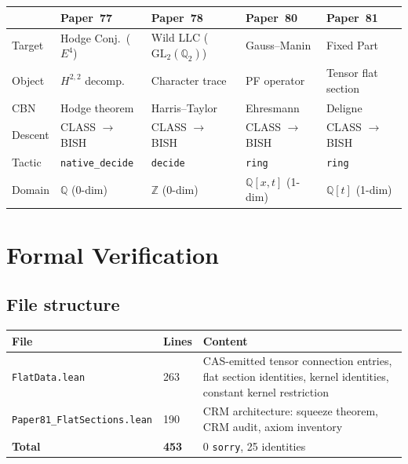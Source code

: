 \documentclass[11pt]{article}
\theoremstyle{plain}
\theoremstyle{definition}
\theoremstyle{remark}
\newcommand{\Z}{\mathbb{Z}}
\newcommand{\Q}{\mathbb{Q}}
\newcommand{\GL}{\mathrm{GL}}
\begin{document}
\begin{center}
\begin{tabular}{lllll}
\toprule
& \textbf{Paper~77} & \textbf{Paper~78} & \textbf{Paper~80} & \textbf{Paper~81} \\
\midrule
Target    & Hodge Conj.\ ($E^4$) & Wild LLC ($\GL_2(\Q_2)$)
          & Gauss--Manin  & Fixed Part \\
Object    & $H^{2,2}$ decomp.\ & Character trace
          & PF operator   & Tensor flat section \\
CBN       & Hodge theorem & Harris--Taylor
          & Ehresmann     & Deligne \\
Descent   & CLASS $\to$ BISH & CLASS $\to$ BISH
          & CLASS $\to$ BISH & CLASS $\to$ BISH \\
Tactic    & \texttt{native\_decide} & \texttt{decide}
          & \texttt{ring} & \texttt{ring} \\
Domain    & $\Q$ (0-dim) & $\Z$ (0-dim)
          & $\Q[x,t]$ (1-dim) & $\Q[t]$ (1-dim) \\
\bottomrule
\end{tabular}
\end{center}

\section{Formal Verification}\label{sec:lean}

\subsection{File structure}

\begin{center}
\begin{tabular}{llp{8cm}}
\toprule
\textbf{File} & \textbf{Lines} & \textbf{Content} \\
\midrule
\texttt{FlatData.lean} & 263 & CAS-emitted tensor connection
  entries, flat section identities, kernel identities,
  constant kernel restriction \\
\texttt{Paper81\_FlatSections.lean} & 190 & CRM architecture:
  squeeze theorem, CRM audit, axiom inventory \\
\midrule
\textbf{Total} & \textbf{453} & 0 \texttt{sorry}, 25 identities \\
\bottomrule
\end{tabular}
\end{center}
\end{document}
